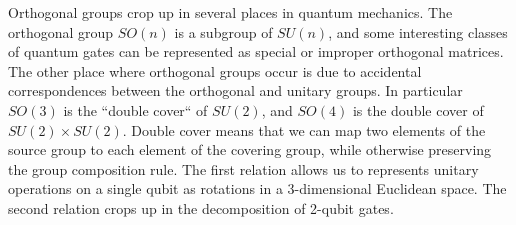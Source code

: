 Orthogonal groups crop up in several places in quantum mechanics. The orthogonal group $SO(n)$ is a subgroup of $SU(n)$, and some interesting classes of quantum gates can be represented as special or improper orthogonal matrices. The other place where orthogonal groups occur is due to accidental correspondences between the orthogonal and unitary groups. In particular $SO(3)$ is the ``double cover`` of $SU(2)$, and $SO(4)$ is the double cover of $SU(2)\times SU(2)$. Double cover means that we can map two elements of the source group to each element of the covering group, while otherwise preserving the group composition rule.  The first relation allows us to represents unitary operations on a single qubit as rotations in a 3-dimensional Euclidean space. The second relation crops up in the decomposition of 2-qubit gates.
\label{accidental}









